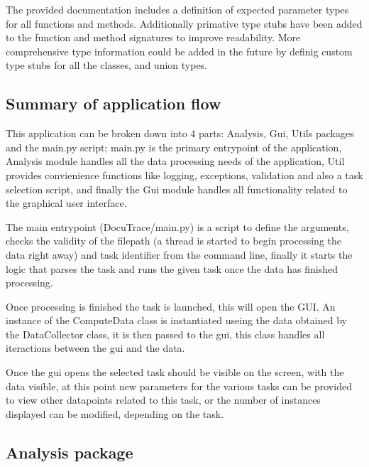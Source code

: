 \documentclass[11pt]{article}
\begin{document}
The provided documentation includes a definition of expected parameter types for all functions and methods. 
Additionally primative type stubs have been added to the function and method signatures to improve readability.
More comprehensive type information could be added in the future by definig custom type stubs for all the classes, and union types.


\subsection{Summary of application flow}
This application can be broken down into 4 parts: Analysis, Gui, Utils packages and the main.py script; 
main.py is the primary entrypoint of the application, Analysis module handles all the data processing needs of the application, Util provides convienience functions like logging, exceptions, validation and also a task selection script, and finally the Gui module handles all functionality related to the graphical user interface. 

The main entrypoint (DocuTrace/main.py) is a script to define the arguments, checks the validity of the filepath (a thread is started to begin processing the data right away) and task identifier from the command line, finally it starts the logic that parses the task and runs the given task once the data has finished processing.

Once processing is finished the task is launched, this will open the GUI. 
An instance of the ComputeData class is instantiated useing the data obtained by the DataCollector class, it is then passed to the gui, this class handles all iteractions between the gui and the data.

Once the gui opens the selected task should be visible on the screen, with the data visible, at this point new parameters for the various tasks can be provided to view other datapoints related to this task, or the number of instances displayed can be modified, depending on the task.

\subsection{Analysis package}
\end{document}
